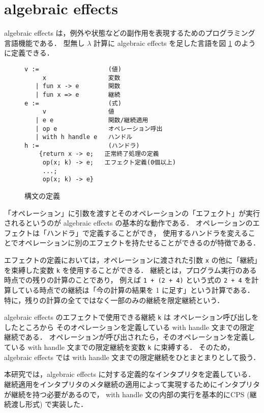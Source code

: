\section{algebraic effects}
\label{section:algebraic effects}

algebraic effects は，例外や状態などの副作用を表現するためのプログラミング言語機能である．
型無し $\lambda$ 計算に algebraic effects を足した言語を図 \ref{figure:effects} のように定義できる．

\begin{figure}
\begin{verbatim}
v :=                   (値)
     x                 変数
   | fun x -> e        関数
   | fun x => e        継続
e :=                   (式)
     v                 値
   | e e               関数/継続適用
   | op e              オペレーション呼出
   | with h handle e   ハンドル
h :=                   (ハンドラ)
    {return x -> e;   正常終了処理の定義
     op(x; k) -> e;   エフェクト定義(0個以上)
     ...;
     op(x; k) -> e}
\end{verbatim}
\caption{構文の定義}
\label{figure:effects}
\end{figure}

「オペレーション」に引数を渡すとそのオペレーションの「エフェクト」が実行されるというのが algebraic effects の基本的な動作である．
オペレーションのエフェクトは「ハンドラ」で定義することができ，
使用するハンドラを変えることでオペレーションに別のエフェクトを持たせることができるのが特徴である．

エフェクトの定義においては，オペレーションに渡された引数 \texttt{x} の他に「継続」を束縛した変数 \texttt{k} を使用することができる．
継続とは，プログラム実行のある時点での残りの計算のことであり，
例えば \texttt{1 + (2 + 4)} という式の \texttt{2 + 4}
を計算している時点での継続は「今の計算の結果を 1 に足す」という計算である．
特に，残りの計算の全てではなく一部のみの継続を限定継続という．

algebraic effects のエフェクトで使用できる継続 \texttt{k} は
オペレーション呼び出しをしたところから
そのオペレーションを定義している with handle 文までの限定継続である．
オペレーションが呼び出されたら，そのオペレーションを定義している with handle 文までの限定継続を変数 \texttt{k} に束縛する．
そのため，algebraic effects では with handle 文までの限定継続をひとまとまりとして扱う．

本研究では，algebraic effects に対する定義的なインタプリタを定義している．
継続適用をインタプリタのメタ継続の適用によって実現するためにインタプリタが継続を持つ必要があるので，
with handle 文の内部の実行を基本的にCPS (継続渡し形式) で実装した．
